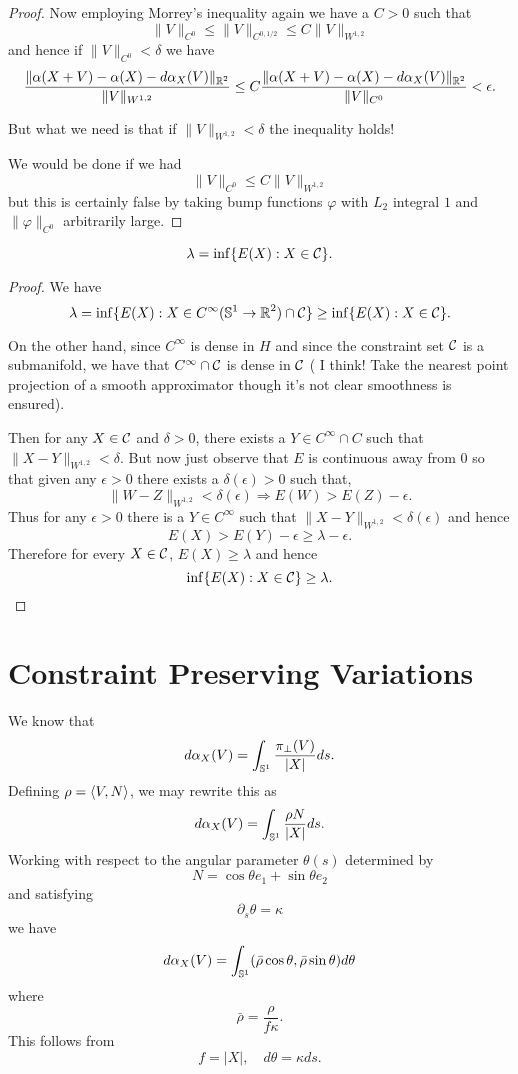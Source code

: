 \documentclass[12pt]{article}
\begin{document}
\begin{proof}
Now employing Morrey's inequality again we have a \(C > 0\) such that
\[
\|V\|_{C^0} \leq \|V\|_{C^{0,1/2}} \leq C \|V\|_{W^{1,2}}
\]
and hence if \(\|V\|_{C^0} < \delta\) we have
\[
\frac{\|\alpha(X + V) - \alpha(X) - d\alpha_X(V)\|_{\operatorname{\mathbb{R}}^2}}{\|V\|_{W^{1,2}}} \leq C \frac{\|\alpha(X + V) - \alpha(X) - d\alpha_X(V)\|_{\operatorname{\mathbb{R}}^2}}{\|V\|_{C^0}} < \epsilon.
\]

{\color{red} But what we need is that if \(\|V\|_{W^{1,2}} < \delta\) the inequality holds!

We would be done if we had
\[
\|V\|_{C^0} \leq C \|V\|_{W^{1,2}}
\]
but this is certainly false by taking bump functions \(\varphi\) with \(L_2\) integral \(1\) and \(\|\varphi\|_{C^0}\) arbitrarily large.}
\end{proof}

\begin{lem}
\label{lem:lambdaH}
\[
\lambda = \inf\{E(X) : X \in \operatorname{\mathcal{C}}\}.
\]
\end{lem}

\begin{proof}
We have
\[
\lambda = \inf\{E(X) : X \in C^{\infty}(\operatorname{\mathbb{S}^1} \to \operatorname{\mathbb{R}}^2) \cap \operatorname{\mathcal{C}}\} \geq \inf\{E(X) : X \in \operatorname{\mathcal{C}}\}.
\]

On the other hand, since \(C^{\infty}\) is dense in \(H\) and since the constraint set \(\operatorname{\mathcal{C}}\) is a submanifold, we have that \(C^{\infty} \cap \operatorname{\mathcal{C}}\) is dense in \(\operatorname{\mathcal{C}}\) ({\color{red} I think! Take the nearest point projection of a smooth approximator though it's not clear smoothness is ensured}).

Then for any \(X \in \operatorname{\mathcal{C}}\) and \(\delta > 0\), there exists a \(Y \in C^{\infty} \cap C\) such that \(\|X - Y\|_{W^{1,2}} < \delta\). But now just observe that \(E\) is continuous away from \(0\) so that given any \(\epsilon > 0\) there exists a \(\delta(\epsilon) > 0\) such that,
\[
\|W - Z\|_{W^{1,2}} < \delta(\epsilon) \Rightarrow E(W) > E(Z) - \epsilon.
\]
Thus for any \(\epsilon > 0\) there is a \(Y \in C^{\infty}\) such that \(\|X - Y\|_{W^{1,2}} < \delta(\epsilon)\) and hence
\[
E(X) > E(Y) - \epsilon \geq \lambda - \epsilon.
\]
Therefore for every \(X \in \operatorname{\mathcal{C}}\), \(E(X) \geq \lambda\) and hence
\[
\inf\{E(X) : X \in \operatorname{\mathcal{C}}\} \geq \lambda.
\]
\end{proof}

\section{Constraint Preserving Variations}

We know that
\[
d\alpha_X (V) = \int_{\operatorname{\mathbb{S}^1}} \frac{\pi_{\perp} (V)}{|X|} ds.
\]
Defining \(\rho = \left\langle{V},{N}\right\rangle\), we may rewrite this as
\[
d\alpha_X (V) = \int_{\operatorname{\mathbb{S}^1}} \frac{\rho N}{|X|} ds.
\]
Working with respect to the angular parameter \(\theta(s)\) determined by
\[
N = \cos \theta e_1 + \sin \theta e_2
\]
and satisfying
\[
\partial_s \theta = \kappa
\]
we have
\[
d\alpha_X (V) = \int_{\operatorname{\mathbb{S}^1}} (\bar{\rho} \cos\theta, \bar{\rho} \sin\theta) d\theta
\]
where
\[
\bar{\rho} = \frac{\rho}{f \kappa}.
\]
This follows from
\[
f = |X|, \quad d\theta = \kappa ds.
\]
\end{document}
